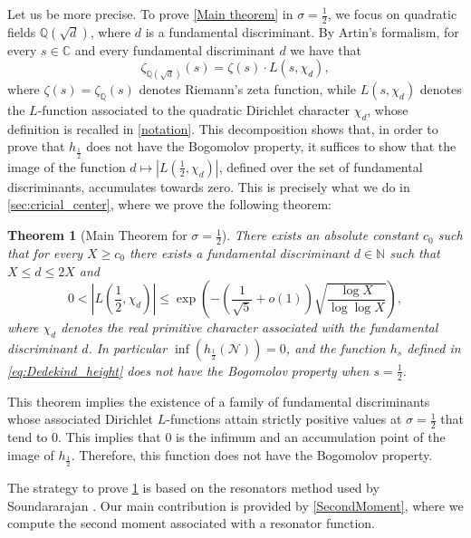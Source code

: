 \documentclass[10pt,a4paper]{amsart}
\theoremstyle{plain}
\newtheorem{theorem}{Theorem}[section]
\theoremstyle{definition}
\theoremstyle{remark}
\newcommand{\C}{\mathbb{C}}
\begin{document}
Let us be more precise. To prove \cref{Main theorem} in $\sigma=\frac{1}{2}$, we focus on quadratic fields $\mathbb{Q}(\sqrt{d})$, where $d$ is a fundamental discriminant. By Artin's formalism, for every $s \in \C$ and every fundamental discriminant $d$ we have that
\begin{equation} \label{Artin formalism}
    \zeta_{\mathbb{Q}(\sqrt{d})}(s) = \zeta(s) \cdot L(s,\chi_d),    
\end{equation}
where $\zeta(s) = \zeta_\mathbb{Q}(s)$ denotes Riemann's zeta function, while $L(s,\chi_d)$ denotes the $L$-function associated to the quadratic Dirichlet character $\chi_d$, whose definition is recalled in \cref{notation}. This decomposition shows that, in order to prove that $h_{\frac{1}{2}}$ does not have the Bogomolov property, it suffices to show that the image of the function $d \mapsto \left\lvert L\left( \frac{1}{2},\chi_d\right) \right\rvert$, defined over the set of fundamental discriminants, accumulates towards zero. 
This is precisely what we do in \cref{sec:cricial_center}, where we prove the following theorem:
\begin{theorem}[Main Theorem for $\sigma=\frac{1}{2}$]\label{Bogomolov}
There exists an absolute constant $c_0$ such that for every $X \geq c_0$ there exists a fundamental discriminant $d \in \mathbb{N}$ such that $X \leq d \leq 2X$ and 
\begin{equation} \label{eq:Bogomolov_inequalities}
    0<\left\lvert L\left(\frac{1}{2},\chi_d\right)\right\rvert\leq \exp\left(-
\left(
\frac{1}{\sqrt{5}}+o(1)\right)\sqrt{\frac{\log X}{\log\log X}}\right),
\end{equation}
where $\chi_d$ denotes the real primitive character associated with the fundamental discriminant $d$. In particular $\inf(h_{\frac{1}{2}}(\mathcal{N})) = 0$, and the function $h_s$ defined in \eqref{eq:Dedekind_height} does not have the Bogomolov property when $s = \frac{1}{2}$.
\end{theorem}

This theorem implies the existence of a family of fundamental discriminants whose associated Dirichlet $L$-functions attain strictly positive values at $\sigma = \frac{1}{2}$ that tend to $0$. This implies that $0$ is the infimum and an accumulation point of the image of $h_{\frac{1}{2}}$. Therefore, this function does not have the Bogomolov property.

The strategy to prove \cref{Bogomolov} is based on the resonators method used by Soundararajan \cite{Soundararajan_2008}. Our main contribution is provided by \cref{SecondMoment}, where we compute the second moment associated with a resonator function.
\end{document}
